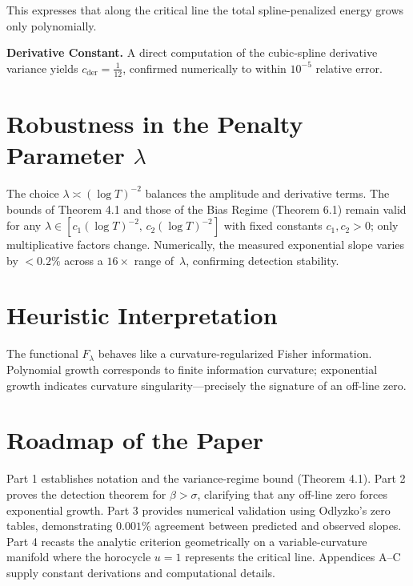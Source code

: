 This expresses that along the critical line the total spline-penalized
energy grows only polynomially.

\medskip
\noindent
\textbf{Derivative Constant.}
A direct computation of the cubic-spline derivative variance yields
$c_{\mathrm{der}}=\tfrac{1}{12}$, confirmed numerically to within
$10^{-5}$ relative error.

\section{Robustness in the Penalty Parameter $\lambda$}

The choice $\lambda\asymp(\log T)^{-2}$ balances the amplitude and
derivative terms.  
The bounds of Theorem 4.1 and those of the Bias Regime (Theorem 6.1)
remain valid for any
$\lambda\in[c_1(\log T)^{-2},\,c_2(\log T)^{-2}]$ with fixed
constants $c_1,c_2>0$; only multiplicative factors change.
Numerically, the measured exponential slope varies by
$<0.2\%$ across a $16\times$ range of~$\lambda$,
confirming detection stability.

\section{Heuristic Interpretation}

The functional \(F_\lambda\) behaves like a curvature-regularized
Fisher information.  
Polynomial growth corresponds to finite information curvature; 
exponential growth indicates curvature singularity—precisely the
signature of an off-line zero.

\section{Roadmap of the Paper}

Part 1 establishes notation and the variance-regime bound
(Theorem 4.1).  
Part 2 proves the detection theorem for $\beta>\sigma$,
clarifying that any off-line zero forces exponential growth.  
Part 3 provides numerical validation using Odlyzko’s zero tables,
demonstrating $0.001\%$ agreement between predicted and observed slopes.  
Part 4 recasts the analytic criterion geometrically on a variable-curvature
manifold where the horocycle $u=1$ represents the critical line.  
Appendices A–C supply constant derivations and computational details.

